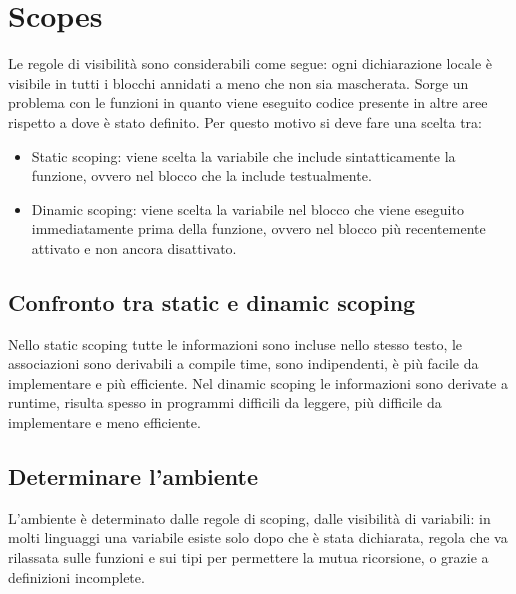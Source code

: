 \section{Scopes}
Le regole di visibilit\`a sono considerabili come segue: ogni dichiarazione locale \`e visibile in tutti i blocchi annidati a meno che non sia mascherata. Sorge un problema 
con le funzioni in quanto viene eseguito codice presente in altre aree rispetto a dove \`e stato definito. Per questo motivo si deve fare una scelta tra:
\begin{itemize}
\item Static scoping: viene scelta la variabile che include sintatticamente la funzione, ovvero nel blocco che la include testualmente.
\item Dinamic scoping: viene scelta la variabile nel blocco che viene eseguito immediatamente prima della funzione, ovvero nel blocco pi\`u recentemente attivato e non ancora
disattivato.
\end{itemize}
\subsection{Confronto tra static e dinamic scoping}
Nello static scoping tutte le informazioni sono incluse nello stesso testo, le associazioni sono derivabili a compile time, sono indipendenti, \`e pi\`u facile da implementare
e pi\`u efficiente. Nel dinamic scoping le informazioni sono derivate a runtime, risulta spesso in programmi difficili da leggere, pi\`u difficile da implementare e meno 
efficiente.
\subsection{Determinare l'ambiente}
L'ambiente \`e determinato dalle regole di scoping, dalle visibilit\`a di variabili: in molti linguaggi una variabile esiste solo dopo che \`e stata dichiarata, regola che
va rilassata sulle funzioni e sui tipi per permettere la mutua ricorsione, o grazie a definizioni incomplete.